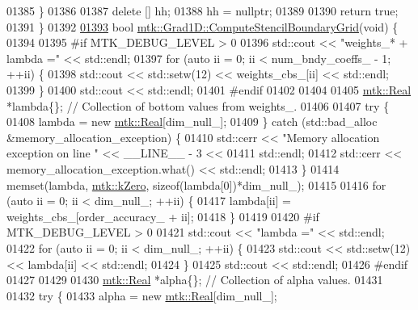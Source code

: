 \begin{DoxyCode}
{{01385   \}
01386 
01387   \textcolor{keyword}{delete} [] hh;
01388   hh = \textcolor{keyword}{nullptr};
01389 
01390   \textcolor{keywordflow}{return} \textcolor{keyword}{true};
01391 \}
01392 
\hypertarget{mtk__grad__1d_8cc_source_l01393}{}\hyperlink{classmtk_1_1Grad1D_a7ad1cecf6b52647263208ffaea0ee1e5}{01393} \textcolor{keywordtype}{bool} \hyperlink{classmtk_1_1Grad1D_a7ad1cecf6b52647263208ffaea0ee1e5}{mtk::Grad1D::ComputeStencilBoundaryGrid}(\textcolor{keywordtype}{void}) \{
01394 
01395 \textcolor{preprocessor}{  #if MTK\_DEBUG\_LEVEL > 0}
01396   std::cout << \textcolor{stringliteral}{"weights\_* + lambda ="} << std::endl;
01397   \textcolor{keywordflow}{for} (\textcolor{keyword}{auto} ii = 0; ii < num\_bndy\_coeffs\_ - 1; ++ii) \{
01398     std::cout << std::setw(12) << weights\_cbs\_[ii] << std::endl;
01399   \}
01400   std::cout << std::endl;
01401 \textcolor{preprocessor}{  #endif}
01402 
01404 
01405   \hyperlink{group__c01-roots_gac080bbbf5cbb5502c9f00405f894857d}{mtk::Real} *lambda\{\}; \textcolor{comment}{// Collection of bottom values from weights\_.}
01406 
01407   \textcolor{keywordflow}{try} \{
01408     lambda = \textcolor{keyword}{new} \hyperlink{group__c01-roots_gac080bbbf5cbb5502c9f00405f894857d}{mtk::Real}[dim\_null\_];
01409   \} \textcolor{keywordflow}{catch} (std::bad\_alloc &memory\_allocation\_exception) \{
01410     std::cerr << \textcolor{stringliteral}{"Memory allocation exception on line "} << \_\_LINE\_\_ - 3 <<
01411       std::endl;
01412     std::cerr << memory\_allocation\_exception.what() << std::endl;
01413   \}
01414   memset(lambda, \hyperlink{group__c01-roots_ga59a451a5fae30d59649bcda274fea271}{mtk::kZero}, \textcolor{keyword}{sizeof}(lambda[0])*dim\_null\_);
01415 
01416   \textcolor{keywordflow}{for} (\textcolor{keyword}{auto} ii = 0; ii < dim\_null\_; ++ii) \{
01417     lambda[ii] = weights\_cbs\_[order\_accuracy\_ + ii];
01418   \}
01419 
01420 \textcolor{preprocessor}{  #if MTK\_DEBUG\_LEVEL > 0}
01421   std::cout << \textcolor{stringliteral}{"lambda ="} << std::endl;
01422   \textcolor{keywordflow}{for} (\textcolor{keyword}{auto} ii = 0; ii < dim\_null\_; ++ii) \{
01423     std::cout << std::setw(12) << lambda[ii] << std::endl;
01424   \}
01425   std::cout << std::endl;
01426 \textcolor{preprocessor}{  #endif}
01427 
01429 
01430   \hyperlink{group__c01-roots_gac080bbbf5cbb5502c9f00405f894857d}{mtk::Real} *alpha\{\}; \textcolor{comment}{// Collection of alpha values.}
01431 
01432   \textcolor{keywordflow}{try} \{
01433     alpha = \textcolor{keyword}{new} \hyperlink{group__c01-roots_gac080bbbf5cbb5502c9f00405f894857d}{mtk::Real}[dim\_null\_];
}}
\end{DoxyCode}
